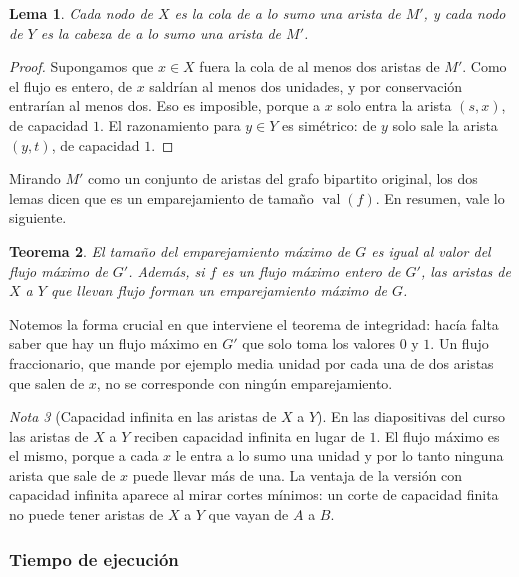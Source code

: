 \documentclass[12pt, spanish, oneside, openany]{book}
\theoremstyle{uprightplain}
\newtheorem{teorema}{Teorema}[section]
\newtheorem{lema}[teorema]{Lema}
\theoremstyle{definition}
\theoremstyle{remark}
\newtheorem{nota}[teorema]{Nota}
\theoremstyle{definition}
\newcommand{\val}{\operatorname{val}}   %
\begin{document}
\begin{lema}
\label{lema:flujo-mprima-x}
Cada nodo de $X$ es la cola de a lo sumo una arista de $M'$, y cada nodo de $Y$ es la cabeza de a lo sumo una arista de $M'$.
\end{lema}
\begin{proof}
Supongamos que $x\in X$ fuera la cola de al menos dos aristas de $M'$. Como el flujo es entero, de $x$ saldrían al menos dos unidades, y por conservación entrarían al menos dos. Eso es imposible, porque a $x$ solo entra la arista $(s,x)$, de capacidad $1$. El razonamiento para $y\in Y$ es simétrico: de $y$ solo sale la arista $(y,t)$, de capacidad $1$.
\end{proof}

Mirando $M'$ como un conjunto de aristas del grafo bipartito original, los dos lemas dicen que es un emparejamiento de tamaño $\val(f)$. En resumen, vale lo siguiente.

\begin{teorema}
\label{teo:flujo-emparejamiento-flujo}
El tamaño del emparejamiento máximo de $G$ es igual al valor del flujo máximo de $G'$. Además, si $f$ es un flujo máximo entero de $G'$, las aristas de $X$ a $Y$ que llevan flujo forman un emparejamiento máximo de $G$.
\end{teorema}

Notemos la forma crucial en que interviene el teorema de integridad: hacía falta saber que hay un flujo máximo en $G'$ que solo toma los valores $0$ y $1$. Un flujo fraccionario, que mande por ejemplo media unidad por cada una de dos aristas que salen de $x$, no se corresponde con ningún emparejamiento.

\begin{nota}[Capacidad infinita en las aristas de $X$ a $Y$]
\label{nota:flujo-bipartito-infinito}
En las diapositivas del curso las aristas de $X$ a $Y$ reciben capacidad infinita en lugar de $1$. El flujo máximo es el mismo, porque a cada $x$ le entra a lo sumo una unidad y por lo tanto ninguna arista que sale de $x$ puede llevar más de una. La ventaja de la versión con capacidad infinita aparece al mirar cortes mínimos: un corte de capacidad finita no puede tener aristas de $X$ a $Y$ que vayan de $A$ a $B$.
\end{nota}

\subsubsection{Tiempo de ejecución}
\end{document}
